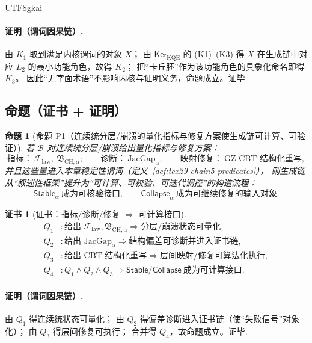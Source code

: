 \documentclass[12pt]{article}
\newtheorem{proposition}{命题}[section]
\newtheorem{Certificate}{证书}[section]
\begin{document}
\begin{CJK*}{UTF8}{gkai}
\paragraph{证明（谓词因果链）.}
由 $K_1$ 取到满足内核谓词的对象 $X$；
由 $\mathsf{Ker}_{\mathrm{KQE}}$ 的 (K1)--(K3) 得 $X$ 在生成链中对应 $L_2$ 的最小功能角色，故得 $K_2$；
把“卡丘胚”作为该功能角色的具象化命名即得 $K_3$。
因此“无字面术语”不影响内核与证明义务，命题成立。证毕.

\subsection{命题（证书 + 证明）}
\label{subsec:tex29-books-cover-chain-proposition}

\begin{proposition}[命题 P1（连续统分层/崩溃的量化指标与修复方案使生成链可计算、可验证）]
\label{prop:tex29-books-continuum-metrics}
若 $\mathcal{B}$ 对连续统分层/崩溃给出量化指标与修复方案：
\[
  \text{指标：}\ \mathcal{F}_{\mathrm{law}},\ \mathfrak{B}_{\mathrm{CH},\alpha};\qquad
  \text{诊断：}\ \mathrm{JacGap}_{\alpha};\qquad
  \text{映射修复：}\ \text{GZ-CBT 结构化重写},
\]
并且这些量进入本章稳定性谓词（定义~\ref{def:tex29-chain5-predicates}），
则生成链从“叙述性框架”提升为“可计算、可校验、可迭代调控”的构造流程：
\[
  \mathsf{Stable}_{\alpha}\ \text{成为可核验接口},\qquad
  \mathsf{Collapse}_{\alpha}\ \text{成为可继续修复的输入对象}.
\]
\end{proposition}

\begin{Certificate}[证书：指标/诊断/修复 $\Rightarrow$ 可计算接口]
\label{cert:tex29-books-continuum-metrics}
\[
\begin{aligned}
  Q_1 &: \text{给出 }\mathcal{F}_{\mathrm{law}},\mathfrak{B}_{\mathrm{CH},\alpha}\Rightarrow \text{分层/崩溃状态可量化},\\
  Q_2 &: \text{给出 }\mathrm{JacGap}_{\alpha}\Rightarrow \text{结构偏差可诊断并进入证书链},\\
  Q_3 &: \text{给出 CBT 结构化重写}\Rightarrow \text{层间映射/修复可算法化执行},\\
  Q_4 &: Q_1\wedge Q_2\wedge Q_3\Rightarrow \mathsf{Stable}/\mathsf{Collapse}\ \text{成为可计算接口}.
\end{aligned}
\]
\end{Certificate}

\paragraph{证明（谓词因果链）.}
由 $Q_1$ 得连续统状态可量化；
由 $Q_2$ 得偏差诊断进入证书链（使“失败信号”对象化）；
由 $Q_3$ 得层间修复可执行；
合并得 $Q_4$，故命题成立。证毕.


\end{CJK*}
\end{document}

